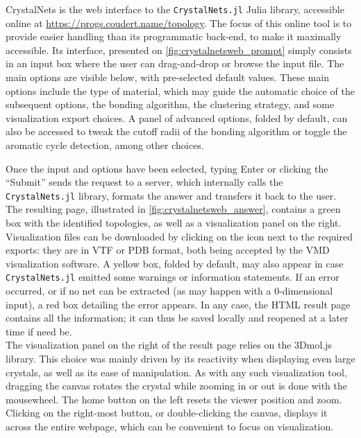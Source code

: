\documentclass[main.tex]{subfiles}
\begin{document}
CrystalNets is the web interface to the \texttt{CrystalNets.jl} Julia library, accessible online at \url{https://progs.coudert.name/topology}. The focus of this online tool is to provide easier handling than its programmatic back-end, to make it maximally accessible. Its interface, presented on \cref{fig:crystalnetsweb_prompt} simply consists in an input box where the user can drag-and-drop or browse the input file. The main options are visible below, with pre-selected default values. These main options include the type of material, which may guide the automatic choice of the subsequent options, the bonding algorithm, the clustering strategy, and some visualization export choices.
A panel of advanced options, folded by default, can also be accessed to tweak the cutoff radii of the bonding algorithm or toggle the aromatic cycle detection, among other choices.

Once the input and options have been selected, typing Enter or clicking the ``Submit'' sends the request to a server, which internally calls the \texttt{CrystalNets.jl} library, formats the answer and transfers it back to the user. The resulting page, illustrated in \cref{fig:crystalnetsweb_answer}, contains a green box with the identified topologies, as well as a visualization panel on the right.
Visualization files can be downloaded by clicking on the icon next to the required  exports: they are in VTF or PDB format, both being accepted by the VMD visualization software\autocite{VMD}.
A yellow box, folded by default, may also appear in case \texttt{CrystalNets.jl} emitted some warnings or information statements.
If an error occurred, or if no net can be extracted (as may happen with a 0-dimensional input), a red box detailing the error appears.
In any case, the HTML result page contains all the information; it can thus be saved locally and reopened at a later time if need be.\\



The visualization panel on the right of the result page relies on the 3Dmol.js library\autocite{3Dmoljs}. This choice was mainly driven by its reactivity when displaying even large crystals, as well as its ease of manipulation. As with any such visualization tool, dragging the canvas rotates the crystal while zooming in or out is done with the mousewheel. The home button on the left resets the viewer position and zoom. Clicking on the right-most button, or double-clicking the canvas, displays it across the entire webpage, which can be convenient to focus on visualization.
\end{document}
